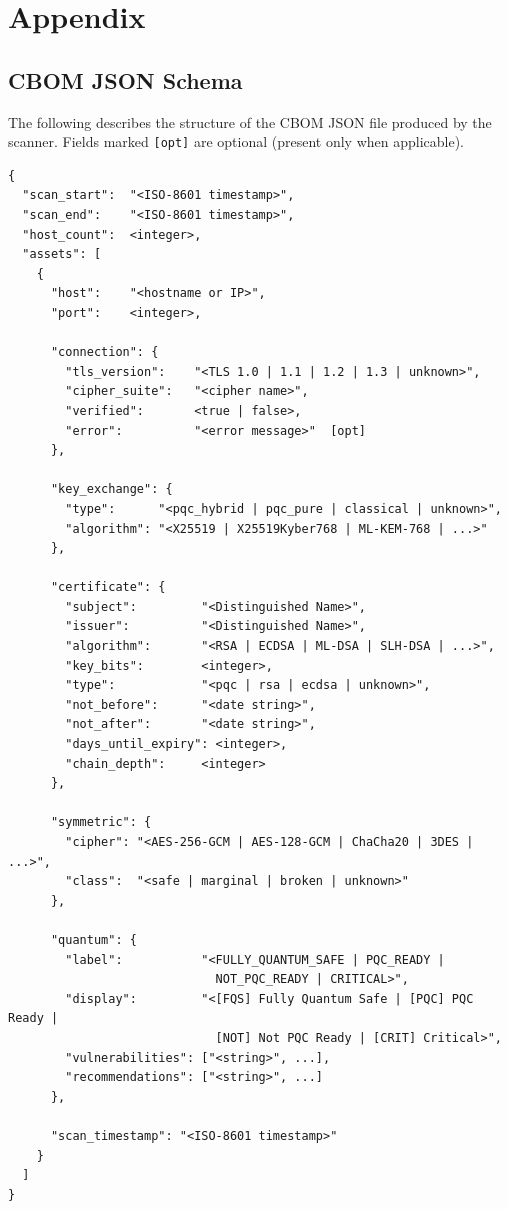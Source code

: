 \chapter{Appendix}
\label{chap:appendix}

\section{CBOM JSON Schema}
\label{sec:cbom_schema}

The following describes the structure of the CBOM JSON file produced by the scanner.
Fields marked \texttt{[opt]} are optional (present only when applicable).

\begin{lstlisting}[language={},caption={CBOM JSON Schema},label=lst:cbom_schema]
{
  "scan_start":  "<ISO-8601 timestamp>",
  "scan_end":    "<ISO-8601 timestamp>",
  "host_count":  <integer>,
  "assets": [
    {
      "host":    "<hostname or IP>",
      "port":    <integer>,

      "connection": {
        "tls_version":    "<TLS 1.0 | 1.1 | 1.2 | 1.3 | unknown>",
        "cipher_suite":   "<cipher name>",
        "verified":       <true | false>,
        "error":          "<error message>"  [opt]
      },

      "key_exchange": {
        "type":      "<pqc_hybrid | pqc_pure | classical | unknown>",
        "algorithm": "<X25519 | X25519Kyber768 | ML-KEM-768 | ...>"
      },

      "certificate": {
        "subject":         "<Distinguished Name>",
        "issuer":          "<Distinguished Name>",
        "algorithm":       "<RSA | ECDSA | ML-DSA | SLH-DSA | ...>",
        "key_bits":        <integer>,
        "type":            "<pqc | rsa | ecdsa | unknown>",
        "not_before":      "<date string>",
        "not_after":       "<date string>",
        "days_until_expiry": <integer>,
        "chain_depth":     <integer>
      },

      "symmetric": {
        "cipher": "<AES-256-GCM | AES-128-GCM | ChaCha20 | 3DES | ...>",
        "class":  "<safe | marginal | broken | unknown>"
      },

      "quantum": {
        "label":           "<FULLY_QUANTUM_SAFE | PQC_READY |
                             NOT_PQC_READY | CRITICAL>",
        "display":         "<[FQS] Fully Quantum Safe | [PQC] PQC Ready |
                             [NOT] Not PQC Ready | [CRIT] Critical>",
        "vulnerabilities": ["<string>", ...],
        "recommendations": ["<string>", ...]
      },

      "scan_timestamp": "<ISO-8601 timestamp>"
    }
  ]
}
\end{lstlisting}

